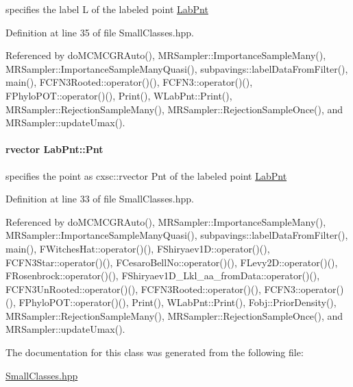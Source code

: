 specifies the label \-L of the labeled point \hyperlink{classLabPnt}{\-Lab\-Pnt} 



\-Definition at line 35 of file \-Small\-Classes.\-hpp.



\-Referenced by do\-M\-C\-M\-C\-G\-R\-Auto(), \-M\-R\-Sampler\-::\-Importance\-Sample\-Many(), \-M\-R\-Sampler\-::\-Importance\-Sample\-Many\-Quasi(), subpavings\-::label\-Data\-From\-Filter(), main(), \-F\-C\-F\-N3\-Rooted\-::operator()(), \-F\-C\-F\-N3\-::operator()(), \-F\-Phylo\-P\-O\-T\-::operator()(), \-Print(), \-W\-Lab\-Pnt\-::\-Print(), \-M\-R\-Sampler\-::\-Rejection\-Sample\-Many(), \-M\-R\-Sampler\-::\-Rejection\-Sample\-Once(), and \-M\-R\-Sampler\-::update\-Umax().

\hypertarget{classLabPnt_a57c17e6672679825de3ba13b7486d276}{
\paragraph[{\-Pnt}]{\setlength{\rightskip}{0pt plus 5cm}rvector {\bf \-Lab\-Pnt\-::\-Pnt}}}\label{classLabPnt_a57c17e6672679825de3ba13b7486d276}


specifies the point as cxsc\-::rvector \-Pnt of the labeled point \hyperlink{classLabPnt}{\-Lab\-Pnt} 



\-Definition at line 33 of file \-Small\-Classes.\-hpp.



\-Referenced by do\-M\-C\-M\-C\-G\-R\-Auto(), \-M\-R\-Sampler\-::\-Importance\-Sample\-Many(), \-M\-R\-Sampler\-::\-Importance\-Sample\-Many\-Quasi(), subpavings\-::label\-Data\-From\-Filter(), main(), \-F\-Witches\-Hat\-::operator()(), \-F\-Shiryaev1\-D\-::operator()(), \-F\-C\-F\-N3\-Star\-::operator()(), \-F\-Cesaro\-Bell\-No\-::operator()(), \-F\-Levy2\-D\-::operator()(), \-F\-Rosenbrock\-::operator()(), \-F\-Shiryaev1\-D\-\_\-\-Lkl\-\_\-aa\-\_\-from\-Data\-::operator()(), \-F\-C\-F\-N3\-Un\-Rooted\-::operator()(), \-F\-C\-F\-N3\-Rooted\-::operator()(), \-F\-C\-F\-N3\-::operator()(), \-F\-Phylo\-P\-O\-T\-::operator()(), \-Print(), \-W\-Lab\-Pnt\-::\-Print(), \-Fobj\-::\-Prior\-Density(), \-M\-R\-Sampler\-::\-Rejection\-Sample\-Many(), \-M\-R\-Sampler\-::\-Rejection\-Sample\-Once(), and \-M\-R\-Sampler\-::update\-Umax().



\-The documentation for this class was generated from the following file\-:\begin{DoxyCompactItemize}
\item 
\hyperlink{SmallClasses_8hpp}{\-Small\-Classes.\-hpp}\end{DoxyCompactItemize}
